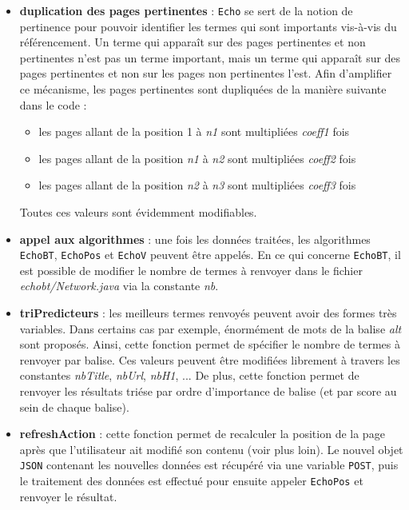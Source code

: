 \documentclass[12pt]{article}
\begin{document}
\begin{itemize}
	\item \textbf{duplication des pages pertinentes} : \texttt{Echo} se sert de la notion de pertinence pour pouvoir identifier les termes qui sont importants vis-à-vis du référencement. Un terme qui apparaît sur des pages pertinentes et non pertinentes n'est pas un terme important, mais un terme qui apparaît sur des pages pertinentes et non sur les pages non pertinentes l'est. Afin d'amplifier ce mécanisme, les pages pertinentes sont dupliquées de la manière suivante dans le code : 
	\begin{itemize}
		\item les pages allant de la position 1 à \textit{n1} sont multipliées \textit{coeff1} fois
		\item les pages allant de la position \textit{n1} à \textit{n2} sont multipliées \textit{coeff2} fois
		\item les pages allant de la position \textit{n2} à \textit{n3} sont multipliées \textit{coeff3} fois
	\end{itemize}
Toutes ces valeurs sont évidemment modifiables.

	\item \textbf{appel aux algorithmes} : une fois les données traitées, les algorithmes \texttt{EchoBT}, \texttt{EchoPos} et \texttt{EchoV} peuvent être appelés. En ce qui concerne \texttt{EchoBT}, il est possible de modifier le nombre de termes à renvoyer dans le fichier \textit{echobt/Network.java} via la constante \textit{nb}.
	
	\item \textbf{triPredicteurs} : les meilleurs termes renvoyés peuvent avoir des formes très variables. Dans certains cas par exemple, énormément de mots de la balise \textit{alt} sont proposés. Ainsi, cette fonction permet de spécifier le nombre de termes à renvoyer par balise. Ces valeurs peuvent être modifiées librement à travers les constantes \textit{nbTitle}, \textit{nbUrl}, \textit{nbH1}, ... De plus, cette fonction permet de renvoyer les résultats triése par ordre d'importance de balise (et par score au sein de chaque balise).
	
	\item \textbf{refreshAction} : cette fonction permet de recalculer la position de la page après que l'utilisateur ait modifié son contenu (voir plus loin). Le nouvel objet \texttt{JSON} contenant les nouvelles données est récupéré via une variable \texttt{POST}, puis le traitement des données est effectué pour ensuite appeler \texttt{EchoPos} et renvoyer le résultat.
\end{itemize}
\end{document}
